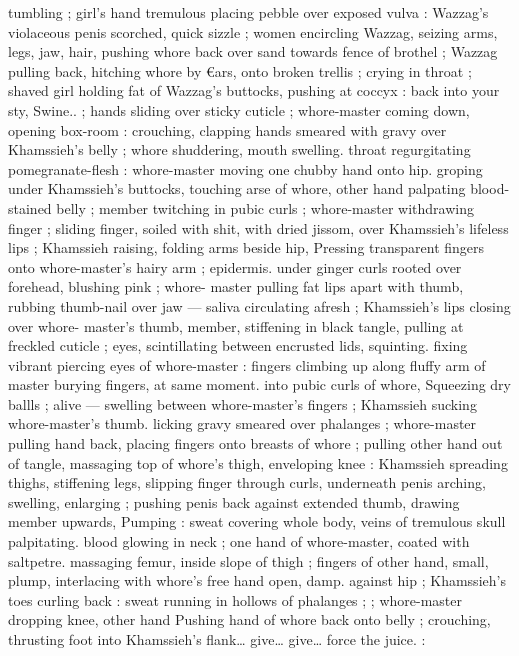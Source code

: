 {tumbling ; girl's hand tremulous placing pebble over exposed vulva : 
Wazzag's violaceous penis scorched, quick sizzle ; women encircling 
Wazzag, seizing arms, legs, jaw, hair, pushing whore back over sand 
towards fence of brothel ; Wazzag pulling back, hitching whore by 
€ars, onto broken trellis ; crying in throat ; shaved girl holding fat of 
Wazzag's buttocks, pushing at coccyx : {\td} {\gl}{\td} back into your sty, 
Swine..{\gr} ; hands sliding over sticky cuticle ; whore-master coming 
down, opening box-room : crouching, clapping hands smeared with 
gravy over Khamssieh's belly ; whore shuddering, mouth swelling. 
throat regurgitating pomegranate-flesh : whore-master moving one 
chubby hand onto hip. groping under Khamssieh's buttocks, touching 
arse of whore, other hand palpating blood-stained belly ; member 
twitching in pubic curls ; whore-master withdrawing finger ; sliding 
finger, soiled with shit, with dried jissom, over Khamssieh's lifeless 
lips ; Khamssieh raising, folding arms beside hip, Pressing 
transparent fingers onto whore-master's hairy arm ; epidermis. 
under ginger curls rooted over forehead, blushing pink ; whore- 
master pulling fat lips apart with thumb, rubbing thumb-nail over jaw 
--- saliva circulating afresh ; Khamssieh's lips closing over whore- 
master's thumb, member, stiffening in black tangle, pulling at 
freckled cuticle ; eyes, scintillating between encrusted lids, squinting. 
fixing vibrant piercing eyes of whore-master : fingers climbing up 
along fluffy arm of master burying fingers, at same moment. into 
pubic curls of whore, Squeezing dry ballls ; alive --- swelling between 
whore-master's fingers ; Khamssieh sucking whore-master's thumb. 
licking gravy smeared over phalanges ; whore-master pulling hand 
back, placing fingers onto breasts of whore ; pulling other hand out 
of tangle, massaging top of whore's thigh, enveloping knee : 
Khamssieh spreading thighs, stiffening legs, slipping finger through 
curls, underneath penis arching, swelling, enlarging ; pushing penis 
back against extended thumb, drawing member upwards, Pumping : 
sweat covering whole body, veins of tremulous skull palpitating. 
blood glowing in neck ; one hand of whore-master, coated with 
saltpetre. massaging femur, inside slope of thigh ; fingers of other 
hand, small, plump, interlacing with whore's free hand open, damp. 
against hip ; Khamssieh's toes curling back : sweat running in 
hollows of phalanges ; ; whore-master dropping knee, other hand 
Pushing hand of whore back onto belly ; crouching, thrusting foot 
into Khamssieh's flank{\ldots} {\gl} give{\ldots} give{\ldots} force the juice. {\gr} : 
}
